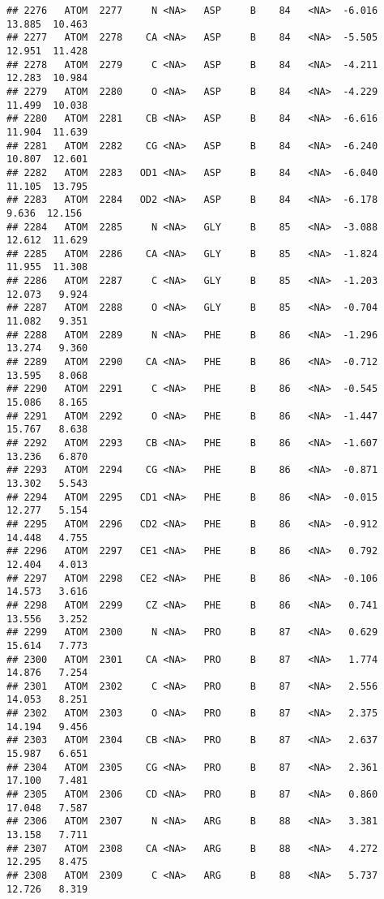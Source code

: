 \documentclass[
]{article}
\begin{document}
\begin{verbatim}
## 2276   ATOM  2277     N <NA>   ASP     B    84   <NA>  -6.016  13.885  10.463
## 2277   ATOM  2278    CA <NA>   ASP     B    84   <NA>  -5.505  12.951  11.428
## 2278   ATOM  2279     C <NA>   ASP     B    84   <NA>  -4.211  12.283  10.984
## 2279   ATOM  2280     O <NA>   ASP     B    84   <NA>  -4.229  11.499  10.038
## 2280   ATOM  2281    CB <NA>   ASP     B    84   <NA>  -6.616  11.904  11.639
## 2281   ATOM  2282    CG <NA>   ASP     B    84   <NA>  -6.240  10.807  12.601
## 2282   ATOM  2283   OD1 <NA>   ASP     B    84   <NA>  -6.040  11.105  13.795
## 2283   ATOM  2284   OD2 <NA>   ASP     B    84   <NA>  -6.178   9.636  12.156
## 2284   ATOM  2285     N <NA>   GLY     B    85   <NA>  -3.088  12.612  11.629
## 2285   ATOM  2286    CA <NA>   GLY     B    85   <NA>  -1.824  11.955  11.308
## 2286   ATOM  2287     C <NA>   GLY     B    85   <NA>  -1.203  12.073   9.924
## 2287   ATOM  2288     O <NA>   GLY     B    85   <NA>  -0.704  11.082   9.351
## 2288   ATOM  2289     N <NA>   PHE     B    86   <NA>  -1.296  13.274   9.360
## 2289   ATOM  2290    CA <NA>   PHE     B    86   <NA>  -0.712  13.595   8.068
## 2290   ATOM  2291     C <NA>   PHE     B    86   <NA>  -0.545  15.086   8.165
## 2291   ATOM  2292     O <NA>   PHE     B    86   <NA>  -1.447  15.767   8.638
## 2292   ATOM  2293    CB <NA>   PHE     B    86   <NA>  -1.607  13.236   6.870
## 2293   ATOM  2294    CG <NA>   PHE     B    86   <NA>  -0.871  13.302   5.543
## 2294   ATOM  2295   CD1 <NA>   PHE     B    86   <NA>  -0.015  12.277   5.154
## 2295   ATOM  2296   CD2 <NA>   PHE     B    86   <NA>  -0.912  14.448   4.755
## 2296   ATOM  2297   CE1 <NA>   PHE     B    86   <NA>   0.792  12.404   4.013
## 2297   ATOM  2298   CE2 <NA>   PHE     B    86   <NA>  -0.106  14.573   3.616
## 2298   ATOM  2299    CZ <NA>   PHE     B    86   <NA>   0.741  13.556   3.252
## 2299   ATOM  2300     N <NA>   PRO     B    87   <NA>   0.629  15.614   7.773
## 2300   ATOM  2301    CA <NA>   PRO     B    87   <NA>   1.774  14.876   7.254
## 2301   ATOM  2302     C <NA>   PRO     B    87   <NA>   2.556  14.053   8.251
## 2302   ATOM  2303     O <NA>   PRO     B    87   <NA>   2.375  14.194   9.456
## 2303   ATOM  2304    CB <NA>   PRO     B    87   <NA>   2.637  15.987   6.651
## 2304   ATOM  2305    CG <NA>   PRO     B    87   <NA>   2.361  17.100   7.481
## 2305   ATOM  2306    CD <NA>   PRO     B    87   <NA>   0.860  17.048   7.587
## 2306   ATOM  2307     N <NA>   ARG     B    88   <NA>   3.381  13.158   7.711
## 2307   ATOM  2308    CA <NA>   ARG     B    88   <NA>   4.272  12.295   8.475
## 2308   ATOM  2309     C <NA>   ARG     B    88   <NA>   5.737  12.726   8.319

\end{verbatim}
\end{document}
